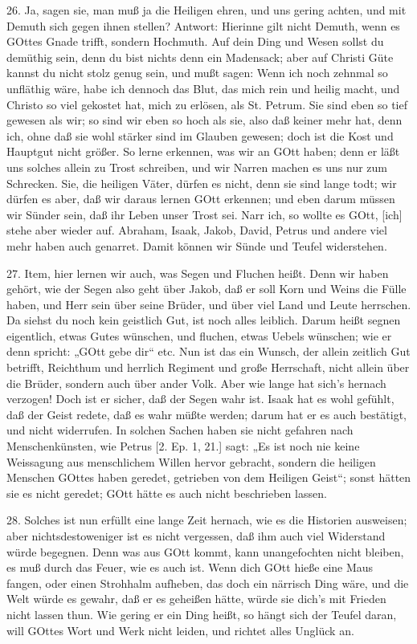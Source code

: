 26. Ja, sagen sie, man muß ja die Heiligen ehren, und uns gering achten, und mit Demuth sich gegen ihnen stellen? Antwort: Hierinne gilt nicht Demuth, wenn es GOttes Gnade trifft, sondern Hochmuth. Auf dein Ding und Wesen sollst du demüthig sein, denn du bist nichts denn ein Madensack; aber auf Christi Güte kannst du nicht stolz genug sein, und mußt sagen: Wenn ich noch zehnmal so unfläthig wäre, habe ich dennoch das Blut, das mich rein und heilig macht, und Christo so viel gekostet hat, mich zu erlösen, als St. Petrum. Sie sind eben so tief gewesen als wir; so sind wir eben so hoch als sie, also daß keiner mehr hat, denn ich, ohne daß sie wohl stärker sind im Glauben gewesen; doch ist die Kost und Hauptgut nicht größer. So lerne erkennen, was wir an GOtt haben; denn er läßt uns solches allein zu Trost schreiben, und wir Narren machen es uns nur zum Schrecken. Sie, die heiligen Väter, dürfen es nicht, denn sie sind lange todt; wir dürfen es aber, daß wir daraus lernen GOtt erkennen; und eben darum müssen wir Sünder sein, daß ihr Leben unser Trost sei. Narr ich, so wollte es GOtt, [ich] stehe aber wieder auf. Abraham, Isaak, Jakob, David, Petrus und andere viel mehr haben auch genarret. Damit können wir Sünde und Teufel widerstehen.

27. Item, hier lernen wir auch, was Segen und Fluchen heißt. Denn wir haben gehört, wie der Segen also geht über Jakob, daß er soll Korn und Weins die Fülle haben, und Herr sein über seine Brüder, und über viel Land und Leute herrschen. Da siehst du noch kein geistlich Gut, ist noch alles leiblich. Darum heißt segnen eigentlich, etwas Gutes wünschen, und fluchen, etwas Uebels wünschen; wie er denn spricht: „GOtt gebe dir“ etc. Nun ist das ein Wunsch, der allein zeitlich Gut betrifft, Reichthum und herrlich Regiment und große Herrschaft, nicht allein über die Brüder, sondern auch über ander Volk. Aber wie lange hat sich’s hernach verzogen! Doch ist er sicher, daß der Segen wahr ist. Isaak hat es wohl gefühlt, daß der Geist redete, daß es wahr müßte werden; darum hat er es auch bestätigt, und nicht widerrufen. In solchen Sachen haben sie nicht gefahren nach Menschenkünsten, wie Petrus [2. Ep. 1, 21.] sagt: „Es ist noch nie keine Weissagung aus menschlichem Willen hervor gebracht, sondern die heiligen Menschen GOttes haben geredet, getrieben von dem Heiligen Geist“; sonst hätten sie es nicht geredet; GOtt hätte es auch nicht beschrieben lassen.

28. Solches ist nun erfüllt eine lange Zeit hernach, wie es die Historien ausweisen; aber nichtsdestoweniger ist es nicht vergessen, daß ihm auch viel Widerstand würde begegnen. Denn was aus GOtt kommt, kann unangefochten nicht bleiben, es muß durch das Feuer, wie es auch ist. Wenn dich GOtt hieße eine Maus fangen, oder einen Strohhalm aufheben, das doch ein närrisch Ding wäre, und die Welt würde es gewahr, daß er es geheißen hätte, würde sie dich’s mit Frieden nicht lassen thun. Wie gering er ein Ding heißt, so hängt sich der Teufel daran, will GOttes Wort und Werk nicht leiden, und richtet alles Unglück an.

